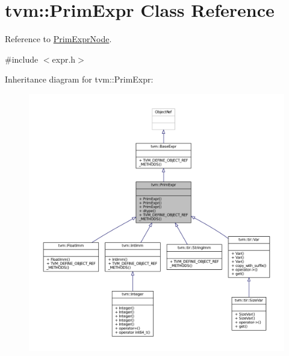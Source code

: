 \hypertarget{classtvm_1_1PrimExpr}{}\section{tvm\+:\+:Prim\+Expr Class Reference}
\label{classtvm_1_1PrimExpr}


Reference to \hyperlink{classtvm_1_1PrimExprNode}{Prim\+Expr\+Node}.  




{\ttfamily \#include $<$expr.\+h$>$}



Inheritance diagram for tvm\+:\+:Prim\+Expr\+:
\nopagebreak
\begin{figure}[H]
\begin{center}
\leavevmode
\includegraphics[width=350pt]{classtvm_1_1PrimExpr__inherit__graph}
\end{center}
\end{figure}


